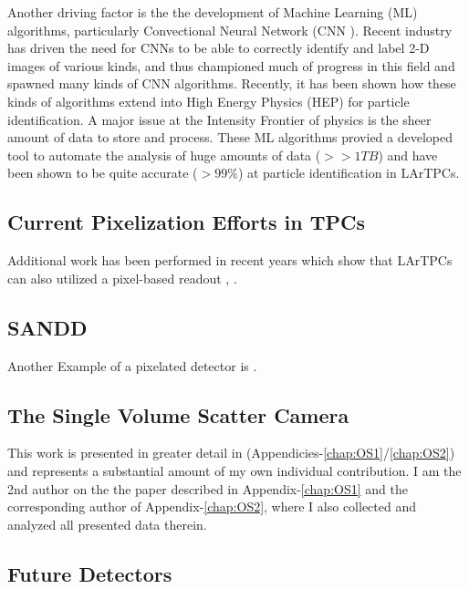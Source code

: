 \citep{Sadowski_2017}
Another driving factor is the the development of Machine Learning (ML) algorithms, particularly Convectional Neural Network (CNN \citep{Sadowski2017DeepLI}). 
Recent industry has driven the need for CNNs to be able to correctly identify and label 2-D images of various kinds, and thus championed much of progress in this field and spawned many kinds of CNN algorithms. 
Recently, it has been shown how these kinds of algorithms extend into High Energy Physics (HEP) for particle identification.
A major issue at the Intensity Frontier of physics is the sheer amount of data to store and process. 
These ML algorithms provied a developed tool to automate the analysis of huge amounts of data ($>> 1 TB$) and have been shown to be quite accurate ($>99\%$) at particle identification in LArTPCs.

\subsection{Current Pixelization Efforts in TPCs}


Additional work has been performed in recent years which show that LArTPCs can also utilized a pixel-based readout \citep{larpix:Dwyer_2018}, \citep{Asaadi_2018}.



\subsection{SANDD}

Another Example of a pixelated detector is \citep{SUTANTO2021_sandd_165409}.


\subsection{The Single Volume Scatter Camera}

This work is presented in greater detail in (Appendicies-\ref{chap:OS1}/\ref{chap:OS2}) and represents a substantial amount of my own individual contribution. 
I am the 2nd author on the the paper described in Appendix-\ref{chap:OS1} and the corresponding author of Appendix-\ref{chap:OS2}, where I also collected and analyzed all presented data therein.

\subsection{Future Detectors}

